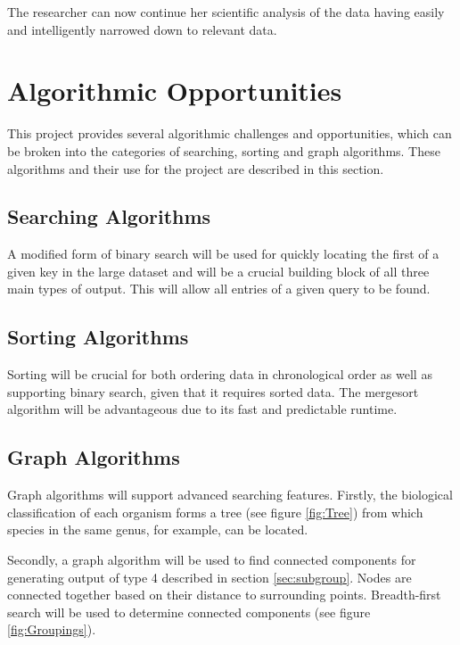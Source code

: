 \documentclass{article}
\begin{document}
The researcher can now continue her scientific analysis of the data having easily and intelligently narrowed down to relevant data.

\section{Algorithmic Opportunities}
This project provides several algorithmic challenges and opportunities, which can be broken into the categories of searching, sorting and graph algorithms. These algorithms and their use for the project are described in this section.

\subsection{Searching Algorithms}
A modified form of binary search will be used for quickly locating the first of a given key in the large dataset and will be a crucial building block of all three main types of output. This will allow all entries of a given query to be found.

\subsection{Sorting Algorithms}
Sorting will be crucial for both ordering data in chronological order as well as supporting binary search, given that it requires sorted data. The mergesort algorithm will be advantageous due to its fast and predictable runtime.

\subsection{Graph Algorithms}\label{sec:graphalgs}
Graph algorithms will support advanced searching features. Firstly, the biological classification of each organism forms a tree (see figure \ref{fig:Tree}) from which species in the same genus, for example, can be located. 

Secondly, a graph algorithm will be used to find connected components for generating output of type 4 described in section \ref{sec:subgroup}. Nodes are connected together based on their distance to surrounding points. Breadth-first search will be used to determine connected components \citep{broder2000graph} (see figure \ref{fig:Groupings}).
\end{document}
